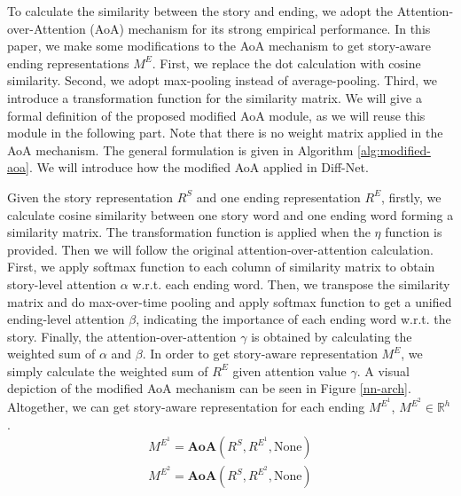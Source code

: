 \documentclass[letterpaper]{article} %
\begin{document}
To calculate the similarity between the story and ending, we adopt the Attention-over-Attention (AoA) mechanism \cite{cui-acl2017-aoa} for its strong empirical performance. 
In this paper, we make some modifications to the AoA mechanism to get story-aware ending representations $M^E$.
First, we replace the dot calculation with cosine similarity. 
Second, we adopt max-pooling instead of average-pooling. 
Third, we introduce a transformation function for the similarity matrix. 
We will give a formal definition of the proposed modified AoA module, as we will reuse this module in the following part. 
Note that there is no weight matrix applied in the AoA mechanism.
The general formulation is given in Algorithm \ref{alg:modified-aoa}.
We will introduce how the modified AoA applied in Diff-Net.

Given the story representation $R^S$ and one ending representation $R^E$, firstly, we calculate cosine similarity between one story word and one ending word forming a similarity matrix.
The transformation function is applied when the $\eta$ function is provided. 
Then we will follow the original attention-over-attention calculation. First, we apply softmax function to each column of similarity matrix to obtain story-level attention $\alpha$ w.r.t. each ending word. Then, we transpose the similarity matrix and do max-over-time pooling and apply softmax function to get a unified ending-level attention $\beta$, indicating the importance of each ending word w.r.t. the story. Finally, the attention-over-attention $\gamma$ is obtained by calculating the weighted sum of $\alpha$ and $\beta$. In order to get story-aware representation $M^E$, we simply calculate the weighted sum of $R^E$ given attention value $\gamma$. 
A visual depiction of the modified AoA mechanism can be seen in Figure \ref{nn-arch}.
Altogether, we can get story-aware representation for each ending $M^{E^1}$, $M^{E^2}  \in \mathbb{R}^{h}$. 
\begin{gather}
M^{E^1} = \mathbf{AoA}(R^S, R^{E^1}, \text{None})  \\
M^{E^2} = \mathbf{AoA}(R^S, R^{E^2}, \text{None}) 
\end{gather}


\renewcommand{\algorithmicrequire}{\textbf{Input:}} 
\renewcommand{\algorithmicensure}{\textbf{Output:}}
\end{document}
